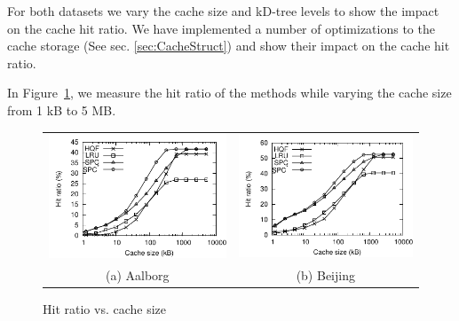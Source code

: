 For both datasets we vary the cache size and kD-tree levels to show the impact on the cache hit ratio. We have implemented a number of optimizations to the cache storage (See sec. \ref{sec:CacheStruct}) and show their impact on the cache hit ratio.


%
In Figure~\ref{fig:cSizeVsHitRatio}, we measure the hit ratio of the methods
while varying the cache size from 1 kB to 5 MB.


\begin{figure}[htb]
\center
  \begin{tabular}{@{}c@{ }c@{}}
     \includegraphics[width=0.5\columnwidth]{figures/cachesize_hitratio_aal.pdf}
     &
     \includegraphics[width=0.5\columnwidth]{figures/cachesize_hitratio_bei.pdf}
      \\
     (a) Aalborg & (b)  Beijing
     \end{tabular}
\caption{Hit ratio vs. cache size }
\label{fig:cSizeVsHitRatio}
\end{figure}

